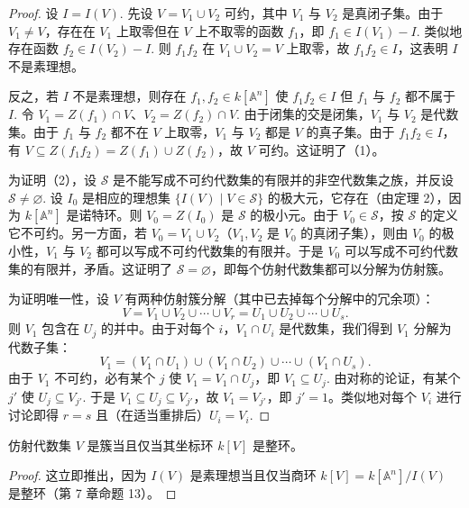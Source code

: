 \begin{proof}
设 \(I = I(V)\). 先设 \(V = V_1 \cup V_2\) 可约，其中 \(V_1\) 与 \(V_2\) 是真闭子集。由于 \(V_1 \neq V\)，存在在 \(V_1\) 上取零但在 \(V\) 上不取零的函数 \(f_1\)，即 \(f_1 \in I(V_1)-I\). 类似地存在函数 \(f_2 \in I(V_2)-I\). 则 \(f_1f_2\) 在 \(V_1 \cup V_2 = V\) 上取零，故 \(f_1f_2 \in I\)，这表明 \(I\) 不是素理想。

反之，若 \(I\) 不是素理想，则存在 \(f_1, f_2 \in k[\mathbb{A}^n]\) 使 \(f_1f_2 \in I\) 但 \(f_1\) 与 \(f_2\) 都不属于 \(I\). 令 \(V_1 = Z(f_1) \cap V\)、\(V_2 = Z(f_2) \cap V\). 由于闭集的交是闭集，\(V_1\) 与 \(V_2\) 是代数集。由于 \(f_1\) 与 \(f_2\) 都不在 \(V\) 上取零，\(V_1\) 与 \(V_2\) 都是 \(V\) 的真子集。由于 \(f_1f_2 \in I\)，有 \(V \subseteq Z(f_1f_2) = Z(f_1) \cup Z(f_2)\)，故 \(V\) 可约。这证明了（1）。

为证明（2），设 \(\mathcal{S}\) 是不能写成不可约代数集的有限并的非空代数集之族，并反设 \(\mathcal{S} \neq \varnothing\). 设 \(I_0\) 是相应的理想集 \(\{I(V) \mid V \in \mathcal{S}\}\) 的极大元，它存在（由定理 2），因为 \(k[\mathbb{A}^n]\) 是诺特环。则 \(V_0 = Z(I_0)\) 是 \(\mathcal{S}\) 的极小元。由于 \(V_0 \in \mathcal{S}\)，按 \(\mathcal{S}\) 的定义它不可约。另一方面，若 \(V_0 = V_1 \cup V_2\)（\(V_1, V_2\) 是 \(V_0\) 的真闭子集），则由 \(V_0\) 的极小性，\(V_1\) 与 \(V_2\) 都可以写成不可约代数集的有限并。于是 \(V_0\) 可以写成不可约代数集的有限并，矛盾。这证明了 \(\mathcal{S} = \varnothing\)，即每个仿射代数集都可以分解为仿射簇。

为证明唯一性，设 \(V\) 有两种仿射簇分解（其中已去掉每个分解中的冗余项）：
\[
V = V_1 \cup V_2 \cup \cdots \cup V_r = U_1 \cup U_2 \cup \cdots \cup U_s.
\]
则 \(V_1\) 包含在 \(U_j\) 的并中。由于对每个 \(i\)，\(V_1 \cap U_i\) 是代数集，我们得到 \(V_1\) 分解为代数子集：
\[
V_1 = (V_1 \cap U_1) \cup (V_1 \cap U_2) \cup \cdots \cup (V_1 \cap U_s).
\]
由于 \(V_1\) 不可约，必有某个 \(j\) 使 \(V_1 = V_1 \cap U_j\)，即 \(V_1 \subseteq U_j\). 由对称的论证，有某个 \(j'\) 使 \(U_j \subseteq V_{j'}\). 于是 \(V_1 \subseteq U_j \subseteq V_{j'}\)，故 \(V_1 = V_{j'}\)，即 \(j' = 1\)。类似地对每个 \(V_i\) 进行讨论即得 \(r = s\) 且（在适当重排后）\(U_i = V_i\).
\end{proof}

\begin{corollary}\label{cor:15.18}
仿射代数集 \(V\) 是簇当且仅当其坐标环 \(k[V]\) 是整环。
\end{corollary}

\begin{proof}
这立即推出，因为 \(I(V)\) 是素理想当且仅当商环 \(k[V] = k[\mathbb{A}^n]/I(V)\) 是整环（第 7 章命题 13）。
\end{proof}

